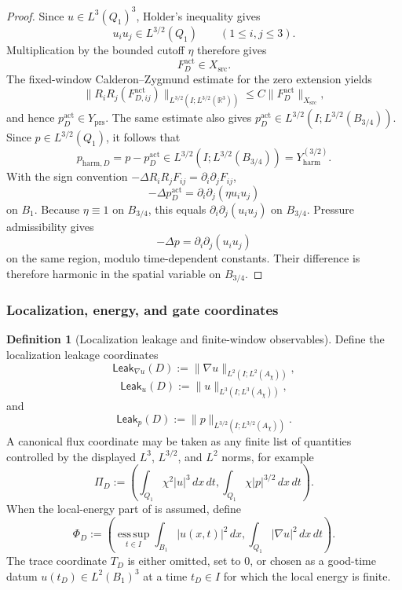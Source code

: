 \documentclass[11pt]{article}
\numberwithin{equation}{section}
\theoremstyle{definition}
\newtheorem{definition}[definition]{Definition}
\theoremstyle{remark}
\newcommand{\R}{\mathbb{R}}
\newcommand{\src}{\mathrm{src}}
\newcommand{\Leak}{\mathsf{Leak}}
\begin{document}
\begin{proof}
Since \(u\in L^3(Q_1)^3\), Holder's inequality gives
\[
    u_i u_j\in L^{3/2}(Q_1)
    \qquad(1\le i,j\le3).
\]
Multiplication by the bounded cutoff \(\eta\) therefore gives
\[
    F_D^{\mathrm{act}}\in X_{\src}.
\]
The fixed-window Calderon--Zygmund estimate for the zero extension yields
\[
    \|R_iR_j(F^{\mathrm{act}}_{D,ij})\|_{L^{3/2}(I;L^{3/2}(\R^3))}
    \le
    C
    \|F_D^{\mathrm{act}}\|_{X_{\src}},
\]
and hence \(p_D^{\mathrm{act}}\in Y_{\mathrm{prs}}\).  The same estimate also
gives \(p_D^{\mathrm{act}}\in L^{3/2}(I;L^{3/2}(B_{3/4}))\).  Since
\(p\in L^{3/2}(Q_1)\), it follows that
\[
    p_{\mathrm{harm},D}=p-p_D^{\mathrm{act}}
    \in
    L^{3/2}(I;L^{3/2}(B_{3/4}))
    =
    Y_{\mathrm{harm}}^{(3/2)}.
\]
With the sign convention \( -\Delta R_iR_jF_{ij}=\partial_i\partial_jF_{ij}\),
\[
    -\Delta p_D^{\mathrm{act}}
    =
    \partial_i\partial_j(\eta u_i u_j)
\]
on \(B_1\).  Because \(\eta\equiv1\) on \(B_{3/4}\), this equals
\(\partial_i\partial_j(u_i u_j)\) on \(B_{3/4}\).  Pressure admissibility gives
\[
    -\Delta p=\partial_i\partial_j(u_i u_j)
\]
on the same region, modulo time-dependent constants.  Their difference is
therefore harmonic in the spatial variable on \(B_{3/4}\).
\end{proof}

\subsubsection{Localization, energy, and gate coordinates}

\begin{definition}[Localization leakage and finite-window observables]
\label{def:leakage-observables}
Define the localization leakage coordinates
\[
    \Leak_{\nabla u}(D)
    :=
    \|\nabla u\|_{L^2(I;L^2(A_\chi))},
\]
\[
    \Leak_u(D)
    :=
    \|u\|_{L^3(I;L^3(A_\chi))},
\]
and
\[
    \Leak_p(D)
    :=
    \|p\|_{L^{3/2}(I;L^{3/2}(A_\chi))}.
\]
A canonical flux coordinate may be taken as any finite list of quantities
controlled by the displayed \(L^3\), \(L^{3/2}\), and \(L^2\) norms, for
example
\[
    \Pi_D
    :=
    \left(
        \int_{Q_1}\chi^2|u|^3\,dx\,dt,
        \int_{Q_1}\chi |p|^{3/2}\,dx\,dt
    \right).
\]
When the local-energy part of  is assumed, define
\[
    \Phi_D
    :=
    \left(
        \operatorname*{ess\,sup}_{t\in I}\int_{B_1}|u(x,t)|^2\,dx,
        \int_{Q_1}|\nabla u|^2\,dx\,dt
    \right).
\]
The trace coordinate \(T_D\) is either omitted, set to \(0\), or chosen as a
good-time datum \(u(t_D)\in L^2(B_1)^3\) at a time \(t_D\in I\) for which the
local energy is finite.
\end{definition}
\end{document}
